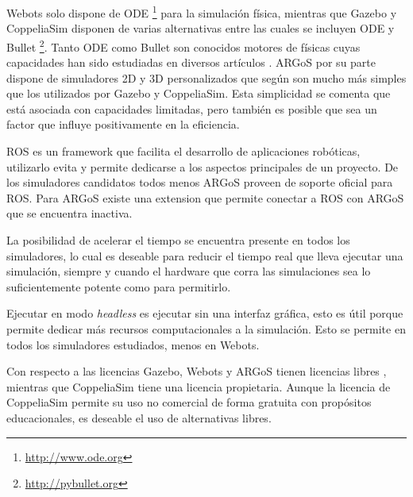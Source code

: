 Webots solo dispone de ODE \footnote{\url{http://www.ode.org}} para la simulación física,
mientras que Gazebo y CoppeliaSim disponen de varias alternativas entre las
cuales se incluyen ODE y Bullet \footnote{\url{http://pybullet.org}}. Tanto ODE como Bullet son conocidos
motores de físicas cuyas capacidades han sido estudiadas en diversos artículos
\cite{bzhikhatlov2017research,erez2015simulation,ronnau2013evaluation}.
ARGoS por su parte dispone de simuladores 2D y 3D personalizados que según
\cite{Pitonakova2018} son mucho más simples que los utilizados por Gazebo y
CoppeliaSim. Esta simplicidad se comenta que está asociada con capacidades
limitadas, pero también es posible que sea un factor que influye positivamente
en la eficiencia.


\gls{ROS} \cite{ros} es un framework que facilita el desarrollo de aplicaciones
robóticas, utilizarlo evita  y permite dedicarse
a los aspectos principales de un proyecto. 
De los simuladores candidatos
todos menos ARGoS proveen de soporte oficial para \gls{ROS}. Para ARGoS existe una
extension \cite{argos_bridge} que permite conectar a \gls{ROS} con ARGoS que se
encuentra inactiva. %


La posibilidad de acelerar el tiempo se encuentra presente en todos los
simuladores, lo cual es deseable para reducir el tiempo real que lleva ejecutar
una simulación, siempre y cuando el hardware que corra las simulaciones sea lo
suficientemente potente como para permitirlo. 

Ejecutar en modo \emph{headless} es ejecutar sin una interfaz gráfica, esto es
útil porque permite dedicar más recursos computacionales a la simulación.
Esto se permite en todos los simuladores estudiados, menos en Webots.

Con respecto a las licencias Gazebo, Webots y ARGoS tienen licencias
libres \cite{fsf}, mientras que CoppeliaSim tiene una licencia propietaria.
Aunque la licencia de CoppeliaSim permite su uso no comercial de forma gratuita
con propósitos educacionales, es deseable el uso de alternativas libres.

